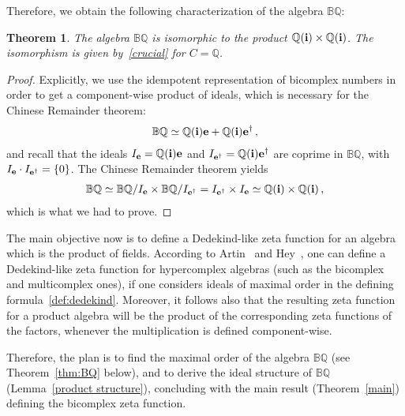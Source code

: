 \documentclass[reqno]{amsart}
\theoremstyle{plain}
\newtheorem{theorem}{Theorem}[section]
\theoremstyle{definition}
\theoremstyle{remark}
\numberwithin{equation}{section}
\begin{document}
\noindent Therefore, we obtain the following characterization of the
algebra ${{\mathbb B}{\mathbb Q}}$:
\begin{theorem}
  \label{BQ:product}
  The algebra ${{\mathbb B}{\mathbb Q}}$ is isomorphic to the product ${{\mathbb Q}}({{\bf i}})\times{{\mathbb Q}}({{\bf i}})$.
  The isomorphism is given by~\eqref{crucial} for $C={{\mathbb Q}}$.
\end{theorem}
\begin{proof}
  Explicitly, we use the idempotent representation of bicomplex
  numbers in order to get a component-wise product of ideals, which is
  necessary for the Chinese Remainder theorem:
  \begin{align*}
    {{\mathbb B}{\mathbb Q}} \simeq {{\mathbb Q}}({{\bf i}}){{\bf e}} + {{\mathbb Q}}({{\bf i}}){{\bf e^\dagger}}\,,
  \end{align*}
  and recall that the ideals $I_{{\bf e}}={{\mathbb Q}}({{\bf i}}){{\bf e}}$ and $I_{{\bf e^\dagger}}={{\mathbb Q}}({{\bf i}}){{\bf e^\dagger}}$
  are coprime in ${{\mathbb B}{\mathbb Q}}$, with $I_{{\bf e}}\cdot I_{{\bf e^\dagger}} = \{0\}$. The Chinese
  Remainder theorem yields
  \begin{align*}
    {{\mathbb B}{\mathbb Q}}  \simeq {{\mathbb B}{\mathbb Q}}/I_{{\bf e}} \times {{\mathbb B}{\mathbb Q}}/I_{{\bf e^\dagger}} = I_{{\bf e^\dagger}} \times I_{{\bf e}}
    \simeq {{\mathbb Q}}({{\bf i}})\times {{\mathbb Q}}({{\bf i}})\,,
  \end{align*}
  which is what we had to prove.
\end{proof}

\bigskip

The main objective now is to define a Dedekind-like zeta function for
an algebra which is the product of fields. According to
Artin~\cite{artin} and Hey~\cite{hey}, one can define a Dedekind-like
zeta function for hypercomplex algebras (such as the bicomplex and
multicomplex ones), if one considers ideals of maximal order in the
defining formula~\eqref{def:dedekind}. Moreover, it follows also that
the resulting zeta function for a product algebra will be the product
of the corresponding zeta functions of the factors, whenever the
multiplication is defined component-wise.

Therefore, the plan is to find the maximal order of the algebra ${{\mathbb B}{\mathbb Q}}$
(see Theorem~\ref{thm:BQ} below), and to derive the ideal structure of
${{\mathbb B}{\mathbb Q}}$ (Lemma~\ref{product structure}), concluding with the main result
(Theorem~\ref{main}) defining the bicomplex zeta function.
\end{document}
